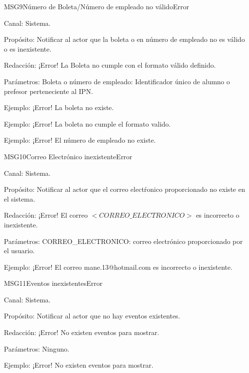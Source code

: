 \begin{mensaje}{MSG9}{Número de Boleta/Número de empleado no válido}{Error}
\item[Canal:] Sistema.
	\item[Propósito:] Notificar al actor que la boleta o en número de empleado no es válido o es inexistente.
	\item[Redacción:] ¡Error! La Boleta no cumple con el formato válido definido.
	\item[Parámetros:] Boleta o número de empleado: Identificador único de alumno o prefesor perteneciente al IPN.
	\item[Ejemplo:] ¡Error! La boleta no existe.
	\item[Ejemplo:] ¡Error! La boleta no cumple el formato valido.
	\item[Ejemplo:] ¡Error! El número de empleado no existe.
\end{mensaje}
\begin{mensaje}{MSG10}{Correo Electrónico inexistente}{Error}
\item[Canal:] Sistema.
	\item[Propósito:] Notificar al actor que el correo electŕonico proporcionado no existe en el sistema.
	\item[Redacción:] ¡Error! El correo $<CORREO\_ELECTRONICO>$ es incorrecto o inexistente.
	\item[Parámetros:] CORREO\_ELECTRONICO: correo electrónico proporcionado por el usuario.
	\item[Ejemplo:] ¡Error! El correo mane.13@hotmail.com es incorrecto o inexistente.
\end{mensaje}

\begin{mensaje}{MSG11}{Eventos inexistentes}{Error}
\item[Canal:] Sistema.
	\item[Propósito:] Notificar al actor que no hay eventos existentes.
	\item[Redacción:] ¡Error! No existen eventos para mostrar.
	\item[Parámetros:] Ninguno.
	\item[Ejemplo:] ¡Error! No existen eventos para mostrar.
	
\end{mensaje}

